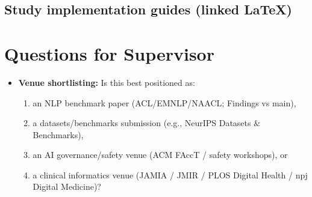 \documentclass[11pt,a4paper]{article}
\begin{document}
\subsection*{Study implementation guides (linked LaTeX)}





\section*{Questions for Supervisor}
\begin{itemize}
  \item \textbf{Venue shortlisting:} Is this best positioned as:
  \begin{enumerate}[label=(\roman*), nosep]
    \item an NLP benchmark paper (ACL/EMNLP/NAACL; Findings vs main),
    \item a datasets/benchmarks submission (e.g., NeurIPS Datasets \& Benchmarks),
    \item an AI governance/safety venue (ACM FAccT / safety workshops), or
    \item a clinical informatics venue (JAMIA / JMIR / PLOS Digital Health / npj Digital Medicine)?
  \end{enumerate}
  

\end{itemize}
\end{document}
